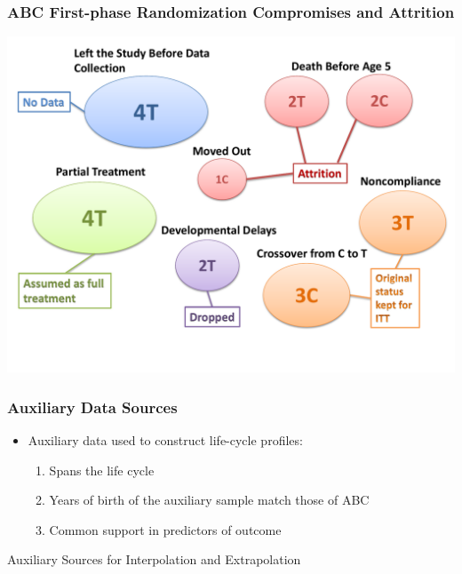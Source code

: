 \documentclass[static]{JJH-Beamer}
\begin{document}

\begin{frame}[noframenumbering]
\frametitle{ABC First-phase Randomization Compromises and Attrition}
\begin{center}
\includegraphics[scale=0.35]{images/abc_p1_randomization.pdf}
\end{center}
\end{frame}


\begin{frame}
\frametitle{Auxiliary Data Sources}
\begin{itemize}
	\item Auxiliary data used to construct life-cycle profiles:
	\begin{enumerate}
		\item Spans the life cycle
		\item Years of birth of the auxiliary sample match those of ABC
		\item Common support in predictors of outcome \mode<presentation>{\end{footnotesize}}
	\end{enumerate}
\end{itemize}
\begin{center}
	Auxiliary Sources for Interpolation and Extrapolation
	
\end{center}
\end{frame}
\end{document}
